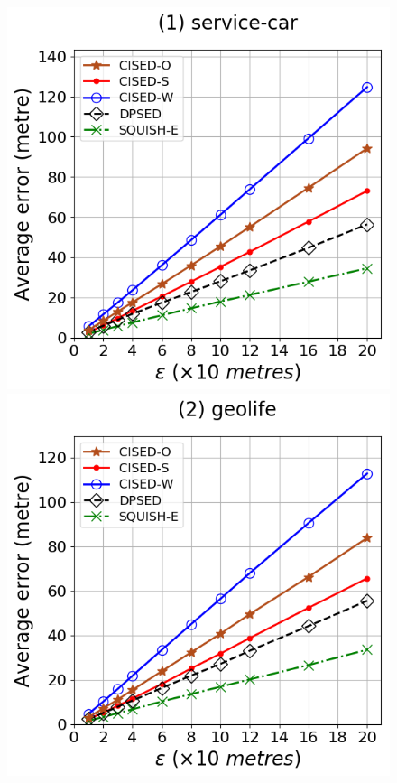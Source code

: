 \begin{figure}[tb]
\centering
\includegraphics[scale = 0.30]{Figures/Exp-error-epsilon-service.png}
\includegraphics[scale = 0.30]{Figures/Exp-error-epsilon-geolife.png}

\end{figure}
